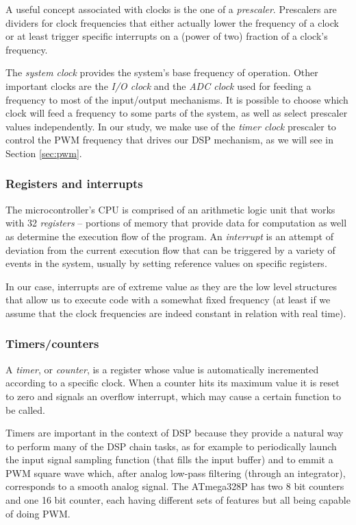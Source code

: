 A useful concept associated with clocks is the one of a \emph{prescaler}.
Prescalers are dividers for clock frequencies that either actually lower the
frequency of a clock or at least trigger specific interrupts on a (power of
two) fraction of a clock's frequency.

The \emph{system clock} provides the system's base frequency of operation.
Other important clocks are the \emph{I/O clock} and the \emph{ADC clock} used
for feeding a frequency to most of the input/output mechanisms. It is possible
to choose which clock will feed a frequency to some parts of the system, as
well as select prescaler values independently. In our study, we make use of
the \emph{timer clock} prescaler to control the PWM frequency that drives our
DSP mechanism, as we will see in Section \ref{sec:pwm}. 

\subsubsection{Registers and interrupts}

The microcontroller's CPU is comprised of an arithmetic logic unit that works
with 32 \emph{registers} -- portions of memory that provide data for
computation as well as determine the execution flow of the program. An
\emph{interrupt} is an attempt of deviation from the current execution flow
that can be triggered by a variety of events in the system, usually by setting
reference values on specific registers.

In our case, interrupts are of extreme value as they are the low level
structures that allow us to execute code with a somewhat fixed frequency (at
least if we assume that the clock frequencies are indeed constant in relation
with real time).

\subsubsection{Timers/counters}

A \emph{timer}, or \emph{counter}, is a register whose value is automatically
incremented according to a specific clock.
When a
counter hits its maximum value it is reset to zero and signals
an overflow interrupt, which may cause a certain function to be called.

Timers are important in the context of DSP because they provide a natural way to
perform many of the DSP chain tasks, as for example to periodically launch the
input signal sampling function (that fills the input buffer) and to emmit a
PWM square wave which, after
analog low-pass 
filtering (through an integrator),
corresponds to a smooth analog signal.
The ATmega328P has two 8 bit counters
and one 16 bit counter, each having different sets of features but all being
capable of doing PWM.

